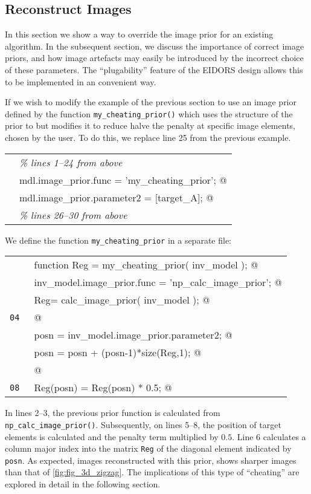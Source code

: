 \documentclass[12pt]{iopart}
\makeatletter
\newcommand{\CN}{\tt\small} %
\newcommand{\CC}{&\verb@}   % start code
\newcommand{\CI}{&\it}   % start code
\makeatother
\begin{document}
\subsection{  Reconstruct Images }

In this section we show a way to override the image prior
for an existing algorithm. In the subsequent section,
we discuss the importance of correct image priors,
and how image artefacts may easily be introduced by the incorrect
choice of these parameters. The ``plugability'' feature of the
EIDORS design allows this to be implemented in an convenient way.

If we wish to modify the example of the previous section
to use an image prior defined by the function
{\tt my\_cheating\_prior()} which uses the structure of the
prior to \cite{Polydorides_2002} but modifies it to reduce
halve the penalty at specific image elements, chosen by
the user. To do this, we replace line 25 from the previous
example.

\begin{tabular}{ll}
\CN    \CI \% lines 1--24 from above \\
\CN    \CC mdl.image_prior.func       = 'my_cheating_prior'; @\\
\CN    \CC mdl.image_prior.parameter2 = [target_A]; @\\
\CN    \CI \% lines 26--30 from above \\
\end{tabular}

We define the function {\tt my\_cheating\_prior} in a separate file:

\begin{tabular}{ll}
\CN    \CC function Reg = my_cheating_prior( inv_model ); @\\
\CN    \CC   inv_model.image_prior.func = 'np_calc_image_prior'; @\\
\CN    \CC   Reg= calc_image_prior( inv_model ); @\\
\CN 04 \CC @\\
\CN    \CC   posn = inv_model.image_prior.parameter2; @\\
\CN    \CC   posn = posn + (posn-1)*size(Reg,1); @\\
\CN    \CC @\\
\CN 08 \CC   Reg(posn) = Reg(posn) * 0.5; @\\
\end{tabular}

In lines 2--3, the previous prior function is calculated
from {\tt np\_calc\_image\_prior()}. Subsequently, on lines
5--8, the position of target elements is calculated and
the penalty term multiplied by $0.5$. Line 6 calculates
a column major index into the matrix {\tt Reg} of the
diagonal element indicated by {\tt posn}. As expected,
images reconstructed with this prior, shows sharper
images than that of \ref{fig:fig_3d_zigzag}.
The implications of this type of ``cheating'' are explored
in detail in the following section.
\end{document}
